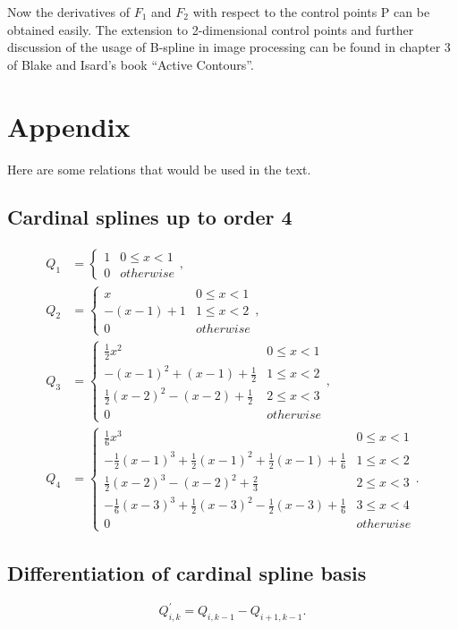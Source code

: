 \documentclass[11pt]{article}
\newcommand{\vP}{\bm{\mathrm{P}}} %
\begin{document}
Now the derivatives of $F_1$ and $F_2$ with respect to the control points $\vP$ can be obtained easily. The extension to 2-dimensional control points and further discussion of the usage of B-spline in image processing can be found in chapter 3 of Blake and Isard's book ``Active Contours''.

\section{Appendix}
Here are some relations that would be used in the text.
\subsection{Cardinal splines up to order 4}
\[
\begin{split}
Q_1 &= 
\begin{cases}
1 & 0 \leq x < 1\\
0 & otherwise
\end{cases}, \\
Q_2 &= 
\begin{cases}
x & 0 \leq x < 1 \\
-(x-1)+1 & 1 \leq x < 2\\
0 & otherwise
\end{cases}, \\
Q_3 &= 
\begin{cases}
\frac{1}{2}x^2 & 0 \leq x < 1 \\
-(x-1)^2+(x-1)+\frac{1}{2} & 1 \leq x < 2\\
\frac{1}{2}(x-2)^2-(x-2)+\frac{1}{2} & 2 \leq x < 3\\
0 & otherwise
\end{cases}, \\
Q_4 &= 
\begin{cases}
\frac{1}{6}x^3 & 0 \leq x < 1 \\
-\frac{1}{2}(x-1)^3+\frac{1}{2}(x-1)^2+\frac{1}{2}(x-1)+\frac{1}{6} & 1 \leq x < 2\\
\frac{1}{2}(x-2)^3-(x-2)^2+\frac{2}{3} & 2 \leq x < 3\\
-\frac{1}{6}(x-3)^3+\frac{1}{2}(x-3)^2-\frac{1}{2}(x-3)+\frac{1}{6} & 3 \leq x < 4\\
0 & otherwise
\end{cases}.
\end{split}
\]

\subsection{Differentiation of cardinal spline basis}
\[
Q^{\prime}_{i,k} = Q_{i,k-1} - Q_{i+1,k-1}.
\]
\end{document}
